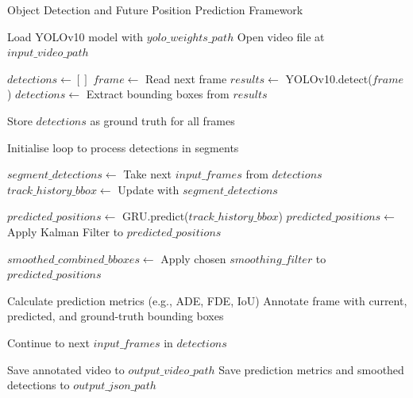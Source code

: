 \documentclass[12pt,oneside]{book} %
\begin{document}
\begin{algorithm}[H]
    \caption{Object Detection and Future Position Prediction Framework}
    \label{alg:framework}
    \begin{algorithmic}[1]

        \State Load YOLOv10 model with $yolo\_weights\_path$
        \State Open video file at $input\_video\_path$

        \State $detections \gets []$
        \State $frame \gets $ Read next frame
        \State $results \gets $ YOLOv10.detect($frame$)
        \State $detections \gets $ Extract bounding boxes from $results$
        \EndWhile

        \State Store $detections$ as ground truth for all frames

        \State Initialise loop to process detections in segments

        \State $segment\_detections \gets $ Take next $input\_frames$ from $detections$
        \State $track\_history\_bbox \gets $ Update with $segment\_detections$

        \State $predicted\_positions \gets $ GRU.predict($track\_history\_bbox$)
        \State $predicted\_positions \gets $ Apply Kalman Filter to $predicted\_positions$
        \EndIf

        \State $smoothed\_combined\_bboxes \gets $ Apply chosen $smoothing\_filter$ to $predicted\_positions$

        \State Calculate prediction metrics (e.g., ADE, FDE, IoU)
        \State Annotate frame with current, predicted, and ground-truth bounding boxes
        \EndFor
        \EndIf

        \State Continue to next $input\_frames$ in $detections$
        \EndWhile

        \State Save annotated video to $output\_video\_path$
        \State Save prediction metrics and smoothed detections to $output\_json\_path$

        \EndProcedure
    \end{algorithmic}
\end{algorithm}
\end{document}
